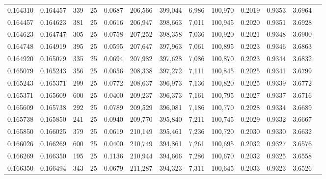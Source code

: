 \begin{tabular}{rrrrrrrrrrrrr}
0.164310 & 0.164457 &   339 &  25 &                                     0.0687 & 206,566 & 399,044 &   6,986 & 100,970 & 0.2019 & 0.9353 & 3.6964 \\
0.164457 & 0.164623 &   381 &  25 &                                     0.0616 & 206,947 & 398,663 &   7,011 & 100,945 & 0.2020 & 0.9351 & 3.6928 \\
0.164623 & 0.164747 &   305 &  25 &                                     0.0758 & 207,252 & 398,358 &   7,036 & 100,920 & 0.2021 & 0.9348 & 3.6900 \\
0.164748 & 0.164919 &   395 &  25 &                                     0.0595 & 207,647 & 397,963 &   7,061 & 100,895 & 0.2023 & 0.9346 & 3.6863 \\
0.164920 & 0.165079 &   335 &  25 &                                     0.0694 & 207,982 & 397,628 &   7,086 & 100,870 & 0.2023 & 0.9344 & 3.6832 \\
0.165079 & 0.165243 &   356 &  25 &                                     0.0656 & 208,338 & 397,272 &   7,111 & 100,845 & 0.2025 & 0.9341 & 3.6799 \\
0.165243 & 0.165371 &   299 &  25 &                                     0.0772 & 208,637 & 396,973 &   7,136 & 100,820 & 0.2025 & 0.9339 & 3.6772 \\
0.165371 & 0.165609 &   600 &  25 &                                     0.0400 & 209,237 & 396,373 &   7,161 & 100,795 & 0.2027 & 0.9337 & 3.6716 \\
0.165609 & 0.165738 &   292 &  25 &                                     0.0789 & 209,529 & 396,081 &   7,186 & 100,770 & 0.2028 & 0.9334 & 3.6689 \\
0.165738 & 0.165850 &   241 &  25 &                                     0.0940 & 209,770 & 395,840 &   7,211 & 100,745 & 0.2029 & 0.9332 & 3.6667 \\
0.165850 & 0.166025 &   379 &  25 &                                     0.0619 & 210,149 & 395,461 &   7,236 & 100,720 & 0.2030 & 0.9330 & 3.6632 \\
0.166026 & 0.166269 &   600 &  25 &                                     0.0400 & 210,749 & 394,861 &   7,261 & 100,695 & 0.2032 & 0.9327 & 3.6576 \\
0.166269 & 0.166350 &   195 &  25 &                                     0.1136 & 210,944 & 394,666 &   7,286 & 100,670 & 0.2032 & 0.9325 & 3.6558 \\
0.166350 & 0.166494 &   343 &  25 &                                     0.0679 & 211,287 & 394,323 &   7,311 & 100,645 & 0.2033 & 0.9323 & 3.6526 \\

\end{tabular}
